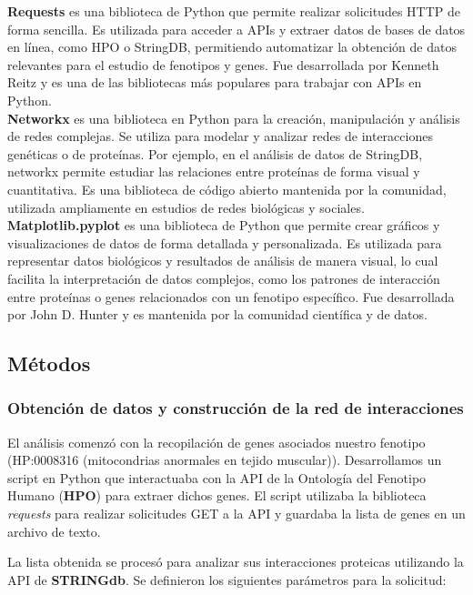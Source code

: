 \textbf{Requests} es una biblioteca de Python que permite realizar solicitudes HTTP de forma sencilla.
Es utilizada para acceder a APIs y extraer datos de bases de datos en línea, como HPO o StringDB, permitiendo automatizar la obtención de datos relevantes para el estudio de fenotipos y genes.
Fue desarrollada por Kenneth Reitz y es una de las bibliotecas más populares para trabajar con APIs en Python.\\


\textbf{Networkx} es una biblioteca en Python para la creación, manipulación y análisis de redes complejas.
Se utiliza para modelar y analizar redes de interacciones genéticas o de proteínas. Por ejemplo, en el análisis de datos de StringDB, networkx permite estudiar las relaciones entre proteínas de forma visual y cuantitativa.
Es una biblioteca de código abierto mantenida por la comunidad, utilizada ampliamente en estudios de redes biológicas y sociales.\\


\textbf{Matplotlib.pyplot} es una biblioteca de Python que permite crear gráficos y visualizaciones de datos de forma detallada y personalizada.
Es utilizada para representar datos biológicos y resultados de análisis de manera visual, lo cual facilita la interpretación de datos complejos, como los patrones de interacción entre proteínas o genes relacionados con un fenotipo específico.
Fue desarrollada por John D. Hunter y es mantenida por la comunidad científica y de datos.



\subsection{\textbf{Métodos}}


\subsubsection{\textbf{Obtención de datos y construcción de la red de interacciones}}

El análisis comenzó con la recopilación de genes asociados nuestro fenotipo (HP:0008316 (mitocondrias anormales en tejido muscular)). Desarrollamos un script en Python que interactuaba con la API de la Ontología del Fenotipo Humano (\textbf{HPO}) para extraer dichos genes. El script utilizaba la biblioteca \textit{requests} para realizar solicitudes GET a la API y guardaba la lista de genes en un archivo de texto.

La lista obtenida se procesó para analizar sus interacciones proteicas utilizando la API de \textbf{STRINGdb}. Se definieron los siguientes parámetros para la solicitud:

